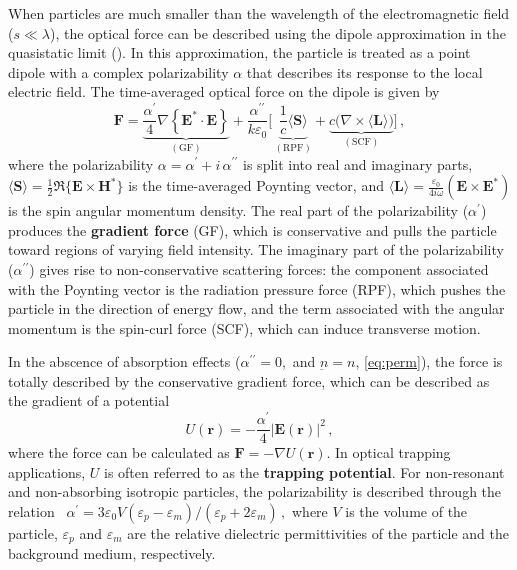 When particles are much smaller than the wavelength of the electromagnetic field 
($s \ll \lambda$), the optical force can be described using the dipole approximation 
in the quasistatic limit (). In this approximation, the 
particle is treated as a point dipole with a complex polarizability $\alpha$ that 
describes its response to the local electric field. 
The time-averaged optical force on the dipole is given by~\cite{novotny}
\begin{equation}\label{eq:dip_force}
    \mathbf{F} = 
    \underbrace{\frac{\alpha^{\prime}}{4} \nabla\left\{ \mathbf{E}^* \cdot \mathbf{E} \right\}}_{(\text{GF})}
    + \frac{\alpha^{\prime\prime}}{k \varepsilon_0}
    \Big[\, \underbrace{\frac{1}{c} \langle \mathbf{S} \rangle}_{(\text{RPF})}
    + \underbrace{c \big( \nabla \times \langle \mathbf{L} \rangle \big)}_{(\text{SCF})} \Big]\,,
\end{equation}
where the polarizability $\alpha = \alpha^\prime + i\,\alpha^{\prime\prime}$ is split into 
real and imaginary parts, $\langle \mathbf{S} \rangle = \frac{1}{2} \Re\{\mathbf{E} \times 
\mathbf{H}^*\}$ is the time-averaged Poynting vector, and 
$\langle \mathbf{L} \rangle = \frac{\varepsilon_0}{4 i \omega} (\mathbf{E} \times \mathbf{E}^*)$ 
is the spin angular momentum density. The real part of the polarizability ($\alpha^\prime$) produces the 
\textbf{gradient force} (GF), which is conservative and pulls the particle toward regions 
of varying field intensity. The imaginary part of the polarizability ($\alpha^{\prime\prime}$) 
gives rise to non-conservative scattering forces: the component associated with the Poynting vector is 
the radiation pressure force (RPF), which pushes the particle in the direction of energy 
flow, and the term associated with the angular momentum is the spin-curl force (SCF), 
which can induce transverse motion. 

In the abscence of absorption effects ($\alpha^{\prime \prime}=0,$ and $\underbar{n}=n$, \eqref{eq:perm}), the force is totally described 
by the conservative gradient force, which can be described as the gradient 
of a potential
\begin{equation*}
    U (\mathbf{r}) = -\frac{\alpha^{\prime}}{4} \left|\mathbf{E}(\mathbf{r})\right|^2\,,
\end{equation*}
where the force can be calculated as $\mathbf{F} = -\nabla U(\mathbf{r})$. In optical trapping applications, $U$ is often referred to as the \textbf{trapping potential}.
For non-resonant and non-absorbing isotropic particles, the polarizability is 
described through the relation~\cite{BornWolf:1999:Book} 
    $\alpha^{\prime}= 3 \varepsilon_0 V (\varepsilon_p-\varepsilon_m)/(\varepsilon_p+2 \varepsilon_m)\,,$
where $V$ is the volume of the particle, $\varepsilon_p$ and $\varepsilon_m$ are the relative
dielectric permittivities of the particle and the background medium, respectively. 

